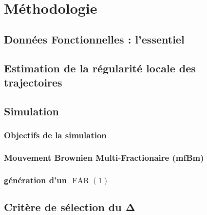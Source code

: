 \chapter{Méthodologie}
\minitoc%

\section{Données Fonctionnelles : l'essentiel}
\label{sec:fda_essentiel}


\section{Estimation de la régularité locale des trajectoires}
\label{sec:estimation_regu_locale}


\section{Simulation}
\label{sec:simulation}
\subsection{Objectifs de la simulation}
\label{subsec:sim-objectif}


\subsection{Mouvement Brownien Multi-Fractionaire (mfBm)}
\label{subsec:mfbm}


\subsection{génération d'un $\operatorname{FAR}(1)$}
\label{subsec:far}


\section{Critère de sélection du Δ}
\label{sec:choix_risque_couple}
